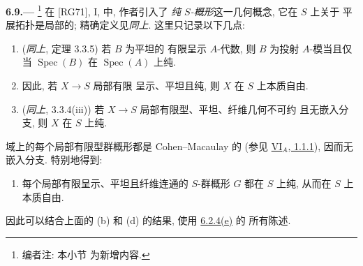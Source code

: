 \medskip
{}\label{par:sga3-VIB-6.9}%
\noindent\textbf{6.9.---}%
\footnote{\label{note:sga3-VIB-67}编者注: 本小节
为新增内容.}
在 [RG71], I,  中, 作者引入了
\emph{纯 \(S\)-概形}这一几何概念, 它在 \(S\) 上关于
平展拓扑是局部的; 精确定义见\emph{同上}.
这里只记录以下几点:
\begin{enumerate}
\item[\textup{a)}]\label{point:sga3-VIB-6.9-a}
  (\emph{同上}, 定理 3.3.5) 若 \(B\) 为平坦的
  有限呈示 \(A\)-代数, 则 \(B\) 为投射
  \(A\)-模当且仅当
  \(\operatorname{Spec}(B)\) 在
  \(\operatorname{Spec}(A)\) 上纯.
\item[\textup{b)}]\label{point:sga3-VIB-6.9-b}
  因此, 若 \(X\to S\) 局部有限
  呈示、平坦且纯, 则 \(X\) 在
  \(S\) 上本质自由.
\item[\textup{c)}]\label{point:sga3-VIB-6.9-c}
  (\emph{同上}, 3.3.4\textup{(iii)}) 若 \(X\to S\)
  局部有限型、平坦、纤维几何不可约
  且无嵌入分支, 则 \(X\) 在
  \(S\) 上纯.
\end{enumerate}
域上的每个局部有限型群概形都是
Cohen--Macaulay 的
(参见 \hyperref[prop:sga3-VIA-1.1.1]{VI\(_A\), 1.1.1}),
因而无嵌入分支. 特别地得到:
\begin{enumerate}
\item[\textup{d)}]\label{point:sga3-VIB-6.9-d}
  每个局部有限呈示、平坦且纤维连通的
  \(S\)-群概形 \(G\) 都在
  \(S\) 上纯, 从而在 \(S\) 上本质自由.
\end{enumerate}
因此可以结合上面的 \textup{(b)} 和 \textup{(d)} 的结果,
使用 \hyperref[ex:sga3-VIB-6.2.4-e]{6.2.4\textup{(e)}} 的
所有陈述.


